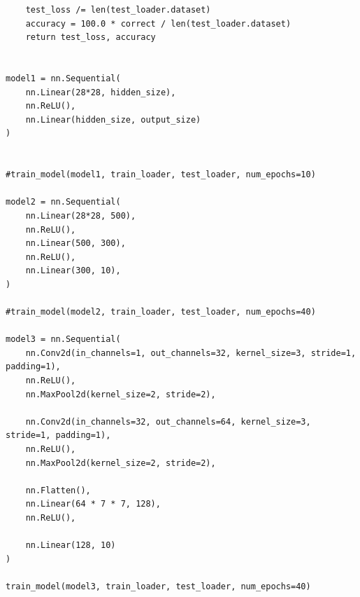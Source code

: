 \documentclass[a4paper]{article}
\begin{document}
\begin{lstlisting}
    test_loss /= len(test_loader.dataset)
    accuracy = 100.0 * correct / len(test_loader.dataset)
    return test_loss, accuracy


model1 = nn.Sequential(
    nn.Linear(28*28, hidden_size),
    nn.ReLU(),
    nn.Linear(hidden_size, output_size)
)


#train_model(model1, train_loader, test_loader, num_epochs=10)

model2 = nn.Sequential(
    nn.Linear(28*28, 500),
    nn.ReLU(),
    nn.Linear(500, 300),
    nn.ReLU(),
    nn.Linear(300, 10),
)

#train_model(model2, train_loader, test_loader, num_epochs=40)

model3 = nn.Sequential(
    nn.Conv2d(in_channels=1, out_channels=32, kernel_size=3, stride=1, padding=1),
    nn.ReLU(),
    nn.MaxPool2d(kernel_size=2, stride=2),

    nn.Conv2d(in_channels=32, out_channels=64, kernel_size=3, stride=1, padding=1),
    nn.ReLU(),
    nn.MaxPool2d(kernel_size=2, stride=2),

    nn.Flatten(),
    nn.Linear(64 * 7 * 7, 128),
    nn.ReLU(),

    nn.Linear(128, 10)
)

train_model(model3, train_loader, test_loader, num_epochs=40)
\end{lstlisting}
\end{document}
